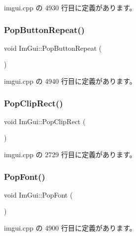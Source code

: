  imgui.\+cpp の 4930 行目に定義があります。

\mbox{\label{namespace_im_gui_a0f883e8507be797ca8ba1448d2b9dbb0}} 
\subsubsection{\texorpdfstring{Pop\+Button\+Repeat()}{PopButtonRepeat()}}
{\footnotesize\ttfamily void Im\+Gui\+::\+Pop\+Button\+Repeat (\begin{DoxyParamCaption}{ }\end{DoxyParamCaption})}



 imgui.\+cpp の 4940 行目に定義があります。

\mbox{\label{namespace_im_gui_aef1c8a6e5a3c70cb10d03d2a2a66dfd8}} 
\subsubsection{\texorpdfstring{Pop\+Clip\+Rect()}{PopClipRect()}}
{\footnotesize\ttfamily void Im\+Gui\+::\+Pop\+Clip\+Rect (\begin{DoxyParamCaption}{ }\end{DoxyParamCaption})}



 imgui.\+cpp の 2729 行目に定義があります。

\mbox{\label{namespace_im_gui_af66649bc37022bf3cf2496c73af9a499}} 
\subsubsection{\texorpdfstring{Pop\+Font()}{PopFont()}}
{\footnotesize\ttfamily void Im\+Gui\+::\+Pop\+Font (\begin{DoxyParamCaption}{ }\end{DoxyParamCaption})}



 imgui.\+cpp の 4900 行目に定義があります。

\mbox{\label{namespace_im_gui_aba0b2d8f890a5d435ae43d0c4a2d4dd1}} 
